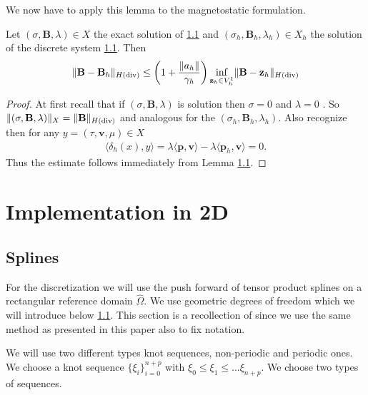 \documentclass[../master_thesis.tex]{subfiles}
\begin{document}
We now have to apply this lemma to the magnetostatic formulation.

\begin{theorem}
    Let $(\sigma,\mathbf{B},\lambda) \in X$ the exact solution of \ref{} and 
    $(\sigma_h,\mathbf{B}_h,\lambda_h) \in X_h$ the solution of the discrete 
    system \ref{}. Then 
    \begin{align*}
        \lVert \mathbf{B} - \mathbf{B}_h \rVert _{H(\operatorname{div})} 
        \leq \left( 1 + \frac{\lVert a_h \rVert}{\gamma_h} \right)
            \inf_{\mathbf{z}_h \in V_h^1} \lVert \mathbf{B} - \mathbf{z}_h \rVert _{H(\operatorname{div})} 
    \end{align*}
\end{theorem}
\begin{proof}
    At first recall that if $(\sigma,\mathbf{B},\lambda)$ is solution then 
    $\sigma = 0$ and $\lambda = 0$ . 
    So $\lVert (\sigma,\mathbf{B},\lambda) \rVert _X = \lVert \mathbf{B} \rVert _{H(\operatorname{div})}$
    and analogous for the $(\sigma_h,\mathbf{B}_h,\lambda_h)$.
    Also recognize then for any $y = (\tau,\mathbf{v}, \mu) \in X$
    \begin{align*}
        \langle \delta_h(x), y \rangle = \lambda \langle \mathbf{p}, \mathbf{v} \rangle 
        - \lambda \langle \mathbf{p}_h, \mathbf{v} \rangle = 0.
    \end{align*}
    Thus the estimate follows immediately from Lemma \ref{}.
\end{proof}

\section{Implementation in 2D}

\subsection{Splines}

For the discretization we will use the push forward of tensor product splines 
on a rectangular reference domain $\hat{\Omega}$. We use geometric degrees of freedom
which we will introduce below \ref{}. This section is a recollection 
 of \cite[Sec. 4.2]{broken FEEC framework on mapped multipatch} 
since we use the same method as presented in this paper also to fix notation. 

We will use two different types knot sequences, non-periodic and periodic ones. 
We choose a knot sequence $\{ \xi_i \}_{i=0}^{n+p}$ with 
$\xi_0 \leq \xi_1 \leq ... \xi_{n+p}$. We choose two types of sequences.
\end{document}
